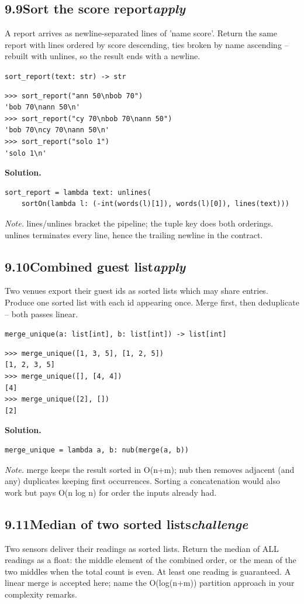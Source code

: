 \documentclass[10pt,letterpaper]{book}
\begin{document}
\subsection*{9.9\quad Sort the score report\hfill\textnormal{\textit{apply}}}
A report arrives as newline-separated lines of 'name score'. Return the same report with lines ordered by score descending, ties broken by name ascending -- rebuilt with unlines, so the result ends with a newline.

\noindent\texttt{sort\_report(text: str) -> str}
\begin{lstlisting}[style=ex]
>>> sort_report("ann 50\nbob 70")
'bob 70\nann 50\n'
>>> sort_report("cy 70\nbob 70\nann 50")
'bob 70\ncy 70\nann 50\n'
>>> sort_report("solo 1")
'solo 1\n'
\end{lstlisting}
\noindent\textbf{Solution.}
\begin{lstlisting}[style=code]
sort_report = lambda text: unlines(
    sortOn(lambda l: (-int(words(l)[1]), words(l)[0]), lines(text)))
\end{lstlisting}
\noindent\textit{Note.} lines/unlines bracket the pipeline; the tuple key does both orderings. unlines terminates every line, hence the trailing newline in the contract.

\subsection*{9.10\quad Combined guest list\hfill\textnormal{\textit{apply}}}
Two venues export their guest ids as sorted lists which may share entries. Produce one sorted list with each id appearing once. Merge first, then deduplicate -- both passes linear.

\noindent\texttt{merge\_unique(a: list[int], b: list[int]) -> list[int]}
\begin{lstlisting}[style=ex]
>>> merge_unique([1, 3, 5], [1, 2, 5])
[1, 2, 3, 5]
>>> merge_unique([], [4, 4])
[4]
>>> merge_unique([2], [])
[2]
\end{lstlisting}
\noindent\textbf{Solution.}
\begin{lstlisting}[style=code]
merge_unique = lambda a, b: nub(merge(a, b))
\end{lstlisting}
\noindent\textit{Note.} merge keeps the result sorted in O(n+m); nub then removes adjacent (and any) duplicates keeping first occurrences. Sorting a concatenation would also work but pays O(n log n) for order the inputs already had.

\subsection*{9.11\quad Median of two sorted lists\hfill\textnormal{\textit{challenge}}}
Two sensors deliver their readings as sorted lists. Return the median of ALL readings as a float: the middle element of the combined order, or the mean of the two middles when the total count is even. At least one reading is guaranteed. A linear merge is accepted here; name the O(log(n+m)) partition approach in your complexity remarks.
\end{document}
